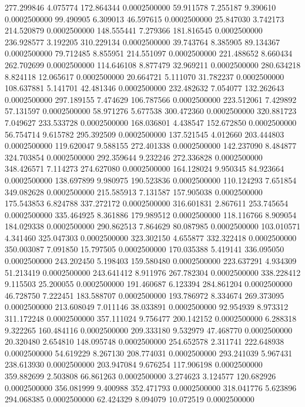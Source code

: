 277.299846 4.075774 172.864344 0.0002500000
59.911578 7.255187 9.390610 0.0002500000
99.490905 6.309013 46.597615 0.0002500000
25.847030 3.742173 214.520879 0.0002500000
148.555441 7.279366 181.816545 0.0002500000
236.928577 3.192205 310.229134 0.0002500000
39.743764 8.385905 89.134367 0.0002500000
79.712485 8.855951 214.551097 0.0002500000
221.488652 8.660434 262.702699 0.0002500000
114.646108 8.877479 32.969211 0.0002500000
280.634218 8.824118 12.065617 0.0002500000
20.664721 5.111070 31.782237 0.0002500000
108.637881 5.141701 42.481346 0.0002500000
232.482632 7.054077 132.262643 0.0002500000
297.189155 7.474629 106.787566 0.0002500000
223.512061 7.429892 57.131597 0.0002500000
58.971276 5.677538 300.472360 0.0002500000
320.881723 7.049627 233.533728 0.0002500000
168.036801 4.438547 152.672850 0.0002500000
56.754714 9.615782 295.392509 0.0002500000
137.521545 4.012660 203.444803 0.0002500000
119.620047 9.588155 272.401338 0.0002500000
142.237090 8.484877 324.703854 0.0002500000
292.359644 9.232246 272.336828 0.0002500000
348.426571 7.114273 274.627080 0.0002500000
164.128024 9.950345 84.923664 0.0002500000
138.697899 9.980975 190.523836 0.0002500000
110.124293 7.651854 349.082628 0.0002500000
215.585913 7.131587 157.905038 0.0002500000
175.543853 6.824788 337.272172 0.0002500000
316.601831 2.867611 253.745654 0.0002500000
335.464925 8.361886 179.989512 0.0002500000
118.116766 8.909054 184.029338 0.0002500000
290.862513 7.864629 80.087985 0.0002500000
103.010571 4.341460 325.047303 0.0002500000
323.302150 4.655877 332.322418 0.0002500000
350.003087 7.091850 15.797505 0.0002500000
170.035388 5.419141 336.095050 0.0002500000
243.202450 5.198403 159.580480 0.0002500000
223.637291 4.934309 51.213419 0.0002500000
243.641412 8.911976 267.782304 0.0002500000
338.228412 9.115503 25.200055 0.0002500000
191.460687 6.123394 284.861204 0.0002500000
46.728750 7.222451 183.588707 0.0002500000
193.786972 8.334674 269.373095 0.0002500000
213.608049 7.011146 38.033891 0.0002500000
92.954939 8.973312 311.172248 0.0002500000
357.111024 9.756477 200.142152 0.0002500000
6.288318 9.322265 160.484116 0.0002500000
209.333180 9.532979 47.468770 0.0002500000
20.320480 2.654810 148.095748 0.0002500000
254.652578 2.311741 222.648938 0.0002500000
54.619229 8.267130 208.774031 0.0002500000
293.241039 5.967431 238.613930 0.0002500000
203.947084 9.676254 117.906198 0.0002500000
359.882699 2.503808 66.861263 0.0002500000
3.274623 3.124577 120.682926 0.0002500000
356.081999 9.400988 352.471793 0.0002500000
318.041776 5.623896 294.068385 0.0002500000
62.424329 8.094079 10.072519 0.0002500000

